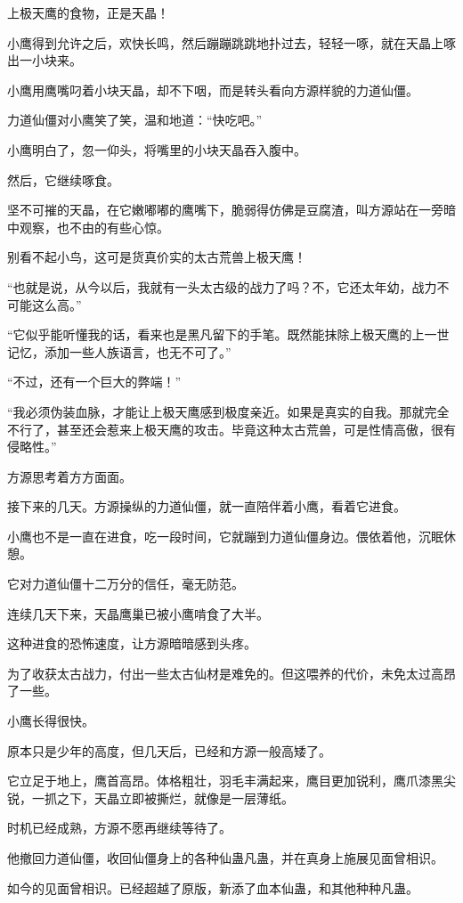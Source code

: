 \begin{this_body}
上极天鹰的食物，正是天晶！

小鹰得到允许之后，欢快长鸣，然后蹦蹦跳跳地扑过去，轻轻一啄，就在天晶上啄出一小块来。

小鹰用鹰嘴叼着小块天晶，却不下咽，而是转头看向方源样貌的力道仙僵。

力道仙僵对小鹰笑了笑，温和地道：“快吃吧。”

小鹰明白了，忽一仰头，将嘴里的小块天晶吞入腹中。

然后，它继续啄食。

坚不可摧的天晶，在它嫩嘟嘟的鹰嘴下，脆弱得仿佛是豆腐渣，叫方源站在一旁暗中观察，也不由的有些心惊。

别看不起小鸟，这可是货真价实的太古荒兽上极天鹰！

“也就是说，从今以后，我就有一头太古级的战力了吗？不，它还太年幼，战力不可能这么高。”

“它似乎能听懂我的话，看来也是黑凡留下的手笔。既然能抹除上极天鹰的上一世记忆，添加一些人族语言，也无不可了。”

“不过，还有一个巨大的弊端！”

“我必须伪装血脉，才能让上极天鹰感到极度亲近。如果是真实的自我。那就完全不行了，甚至还会惹来上极天鹰的攻击。毕竟这种太古荒兽，可是性情高傲，很有侵略性。”

方源思考着方方面面。

接下来的几天。方源操纵的力道仙僵，就一直陪伴着小鹰，看着它进食。

小鹰也不是一直在进食，吃一段时间，它就蹦到力道仙僵身边。偎依着他，沉眠休憩。

它对力道仙僵十二万分的信任，毫无防范。

连续几天下来，天晶鹰巢已被小鹰啃食了大半。

这种进食的恐怖速度，让方源暗暗感到头疼。

为了收获太古战力，付出一些太古仙材是难免的。但这喂养的代价，未免太过高昂了一些。

小鹰长得很快。

原本只是少年的高度，但几天后，已经和方源一般高矮了。

它立足于地上，鹰首高昂。体格粗壮，羽毛丰满起来，鹰目更加锐利，鹰爪漆黑尖锐，一抓之下，天晶立即被撕烂，就像是一层薄纸。

时机已经成熟，方源不愿再继续等待了。

他撤回力道仙僵，收回仙僵身上的各种仙蛊凡蛊，并在真身上施展见面曾相识。

如今的见面曾相识。已经超越了原版，新添了血本仙蛊，和其他种种凡蛊。


\end{this_body}
